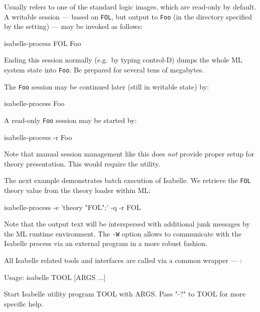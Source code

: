 \begin{isabellebody}
\begin{isamarkuptext}
  Usually \hyperlink{setting.ISABELLE-LOGIC}{\mbox{}} refers to one of the standard
  logic images, which are read-only by default.  A writable session
  --- based on \verb|FOL|, but output to \verb|Foo| (in the
  directory specified by the \hyperlink{setting.ISABELLE-OUTPUT}{\mbox{}} setting) ---
  may be invoked as follows:
\begin{ttbox}
isabelle-process FOL Foo
\end{ttbox}
  Ending this session normally (e.g.\ by typing control-D) dumps the
  whole ML system state into \verb|Foo|. Be prepared for several
  tens of megabytes.

  The \verb|Foo| session may be continued later (still in
  writable state) by:
\begin{ttbox}
isabelle-process Foo
\end{ttbox}
  A read-only \verb|Foo| session may be started by:
\begin{ttbox}
isabelle-process -r Foo
\end{ttbox}

  \medskip Note that manual session management like this does
  \emph{not} provide proper setup for theory presentation.  This would
  require the \hyperlink{tool.usedir}{\mbox{}} utility.

  \bigskip The next example demonstrates batch execution of Isabelle.
  We retrieve the \verb|FOL| theory value from the theory loader
  within ML:
\begin{ttbox}
isabelle-process -e 'theory "FOL";' -q -r FOL
\end{ttbox}
  Note that the output text will be interspersed with additional junk
  messages by the ML runtime environment.  The \verb|-W| option
  allows to communicate with the Isabelle process via an external
  program in a more robust fashion.%
\end{isamarkuptext}%
\isamarkuptrue%
%
\isamarkuptrue%
%
\begin{isamarkuptext}%
All Isabelle related tools and interfaces are called via a common
  wrapper --- \hyperlink{executable.isabelle}{\mbox{}}:

\begin{ttbox}
Usage: isabelle TOOL [ARGS ...]

  Start Isabelle utility program TOOL with ARGS. Pass "-?" to TOOL
  for more specific help.


\end{ttbox}
\end{isamarkuptext}
\end{isabellebody}
